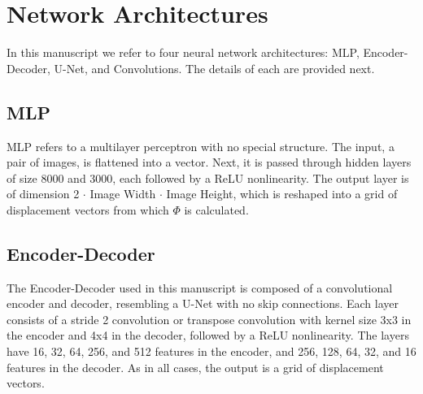 \documentclass[10pt,onecolumn,letterpaper]{article} %
\begin{document}




\section{Network Architectures}

In this manuscript we refer to four neural network architectures: MLP, Encoder-Decoder, U-Net, and Convolutions. The details of each are provided next.\\
\subsection{MLP} MLP refers to a multilayer perceptron with no special structure. The input, a pair of images, is flattened into a vector. Next, it is passed through hidden layers of size 8000 and 3000, each followed by a ReLU nonlinearity. The output layer is of dimension 2 $\cdot$ Image Width $\cdot$ Image Height, which is reshaped into a grid of displacement vectors from which $\Phi$ is calculated.\\
\subsection{Encoder-Decoder} The Encoder-Decoder used in this manuscript is composed of a convolutional encoder and decoder, resembling a U-Net with no skip connections. Each layer consists of a stride 2 convolution or transpose convolution with kernel size 3x3 in the encoder and 4x4 in the decoder, followed by a ReLU nonlinearity. The layers have 16, 32, 64, 256, and 512 features in the encoder, and 256, 128, 64, 32, and 16  features in the decoder. As in all cases, the output is a grid of displacement vectors.\\
\end{document}
